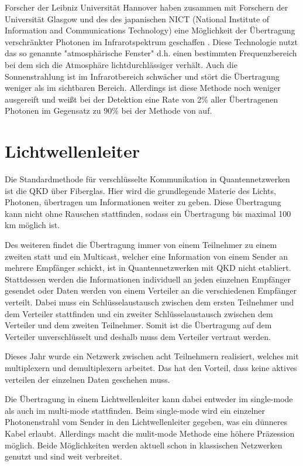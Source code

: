 Forscher der Leibniz Universität Hannover haben zusammen mit Forschern der Universität Glasgow und des des japanischen NICT (National Institute of Information and Communications Technology) eine Möglichkeit der Übertragung verschränkter Photonen im Infrarotspektrum geschaffen \cite{prabhakar_two-photon_2020}. Diese Technologie nutzt das so genannte "atmosphärische Fenster" d.h. einen bestimmten Frequenzbereich bei dem sich die Atmosphäre lichtdurchlässiger verhält. Auch die Sonnenstrahlung ist im Infrarotbereich schwächer und stört die Übertragung weniger als im sichtbaren Bereich. Allerdings ist diese Methode noch weniger ausgereift und weißt bei der Detektion eine Rate von 2\% aller Übertragenen Photonen im Gegensatz zu 90\% bei der Methode von \cite{Ren_2017} auf.

\section{Lichtwellenleiter}

Die Standardmethode für verschlüsselte Kommunikation in Quantennetzwerken ist die \ac{QKD} über Fiberglas.
Hier wird die grundlegende Materie des Lichts, Photonen, übertragen um Informationen weiter zu geben.
Diese Übertragung kann nicht ohne Rauschen stattfinden, sodass ein Übertragung bis maximal 100 km möglich ist\cite{Shen2018}.

Des weiteren findet die Übertragung immer von einem Teilnehmer zu einem zweiten statt und ein Multicast, welcher eine Information von einem Sender an mehrere Empfänger schickt, ist in Quantennetzwerken mit \ac{QKD} nicht etabliert.
Stattdessen werden die Informationen individuell an jeden einzelnen Empfänger gesendet oder Daten werden von einem Verteiler an die verschiedenen Empfänger verteilt.
Dabei muss ein Schlüsselaustausch zwischen dem ersten Teilnehmer und dem Verteiler stattfinden und ein zweiter Schlüsselaustausch zwischen dem Verteiler und dem zweiten Teilnehmer.
Somit ist die Übertragung auf dem Verteiler unverschlüsselt und deshalb muss dem Verteiler vertraut werden\cite{Qiu2018}.

Dieses Jahr wurde ein Netzwerk zwischen acht Teilnehmern realisiert, welches mit multiplexern und demultiplexern arbeitet.
Das hat den Vorteil, dass keine aktives verteilen der einzelnen Daten geschehen muss\cite{Siddarth2020}.

Die Übertragung in einem Lichtwellenleiter kann dabei entweder im single-mode als auch im multi-mode stattfinden.
Beim single-mode wird ein einzelner Photonenstrahl vom Sender in den Lichtwellenleiter gegeben, was ein dünneres Kabel erlaubt.
Allerdings macht die mulit-mode Methode eine höhere Präzession möglich\cite{VanMeter2014}.
Beide Möglichkeiten werden aktuell schon in klassischen Netzwerken genutzt und sind weit verbreitet.

